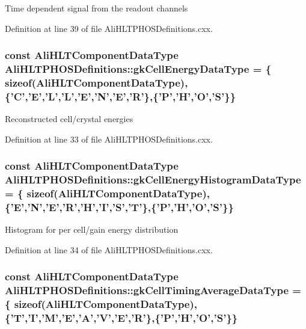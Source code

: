 Time dependent signal from the readout channels 

Definition at line 39 of file Ali\-HLTPHOSDefinitions.cxx.
\subsubsection{\setlength{\rightskip}{0pt plus 5cm}const {\bf Ali\-HLTComponent\-Data\-Type} {\bf Ali\-HLTPHOSDefinitions::gk\-Cell\-Energy\-Data\-Type} = \{ sizeof({\bf Ali\-HLTComponent\-Data\-Type}), \{'C','E','L','L','E','N','E','R'\},\{'P','H','O','S'\}\}\hspace{0.3cm}{\tt  [static]}}\label{classAliHLTPHOSDefinitions_s0}


Reconstructed cell/crystal energies 

Definition at line 33 of file Ali\-HLTPHOSDefinitions.cxx.
\subsubsection{\setlength{\rightskip}{0pt plus 5cm}const {\bf Ali\-HLTComponent\-Data\-Type} {\bf Ali\-HLTPHOSDefinitions::gk\-Cell\-Energy\-Histogram\-Data\-Type} = \{ sizeof({\bf Ali\-HLTComponent\-Data\-Type}), \{'E','N','E','R','H','I','S','T'\},\{'P','H','O','S'\}\}\hspace{0.3cm}{\tt  [static]}}\label{classAliHLTPHOSDefinitions_s2}


Histogram for per cell/gain energy distribution 

Definition at line 34 of file Ali\-HLTPHOSDefinitions.cxx.
\subsubsection{\setlength{\rightskip}{0pt plus 5cm}const {\bf Ali\-HLTComponent\-Data\-Type} {\bf Ali\-HLTPHOSDefinitions::gk\-Cell\-Timing\-Average\-Data\-Type} = \{ sizeof({\bf Ali\-HLTComponent\-Data\-Type}), \{'T','I','M','E','A','V','E','R'\},\{'P','H','O','S'\}\}\hspace{0.3cm}{\tt  [static]}}\label{classAliHLTPHOSDefinitions_s6}


